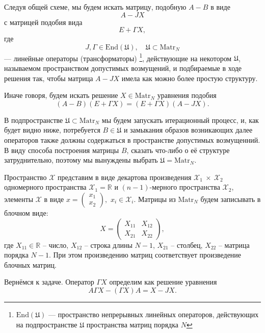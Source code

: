 Следуя общей схеме, мы будем искать матрицу, подобную \( A - B \)
в виде
\[ A - J X \]
с матрицей подобия вида
\[ E + \Gamma X ,\]
где
\[ J, \Gamma \in \mathrm{End}\left(\mathfrak U\right),\quad \mathfrak{U}\subset\mathrm{Matr}_{N} \]
--- линейные операторы (трансформаторы)
\footnote{\( \mathrm{End}\left(\mathfrak U\right) \) --- пространство непрерывных линейных операторов,
действующих на подпространстве \( \mathfrak U \) пространства матриц порядка \( N \)},
действующие на некотором \( \mathfrak U \),
называемом пространством допустимых возмущений,
и подбираемые в ходе решения так, чтобы матрица \( A - JX \)
имела как можно более простую структуру.

Иначе говоря, будем искать решение \( X \in\mathrm{Matr}_{N} \)
уравнения подобия
\begin{equation}\label{eq:similarity-orig}
    (A - B)(E+\Gamma X) = (E+\Gamma X) (A - JX).
\end{equation}

В подпространстве \( \mathfrak U \subset \mathrm{Matr}_{N} \)
мы будем запускать итерационный процесс,
и, как будет видно ниже, потребуется \( B \in \mathfrak U \)
и замыкания образов возникающих далее операторов также
должны содержаться в
пространстве допустимых возмущенний.
В виду способа построения матрицы \( B \), сказать что-либо о её структуре затруднительно,
поэтому мы вынуждены выбрать \( \mathfrak U = \mathrm{Matr}_{N}\).

Пространство \( \mathscr{X} \) представим в виде
декартова произведения
\( \mathscr{X}_1~\times~\mathscr{X}_2 \)
одномерного пространства \( \mathscr{X}_1=\mathbb{R} \)
и \((n-1)\)-мерного пространства \( \mathscr{X}_2 \),
элементы \( \mathscr{X} \) в виде
\( x=\begin{pmatrix}x_1\\x_2\end{pmatrix}, \)
\( x_i\in\mathscr{X}_i \).
Матрицы из \( \mathrm{Matr}_{N} \) будем записывать
в блочном виде:
\[
    X = \begin{pmatrix}
    X_{11} & X_{12} \\
    X_{21} & X_{22}
    \end{pmatrix},
    \]
где \( { X_{11}\in\mathbb{R} } \) -- число,
    \( X_{12} \) -- строка длины \( N-1 \),
    \( X_{21} \) -- столбец,
    \( X_{22} \) -- матрица порядка \( N-1 \).
При этом произведению матриц соответствует произведение блочных матриц.

Вернёмся к задаче.
Оператор \( \Gamma X \) определим как решение уравнения\footnotemark
\[
    A\Gamma X - (\Gamma X) A = X - JX.
    \]

